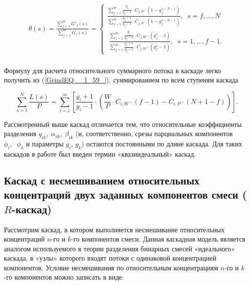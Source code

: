 \begin{equation} \label{GrindEQ__1_61_} 
  \begin{array}{l} {\theta (s)=\frac{\sum _{j=1}^{m}G'_{j} (s) }{\sum _{j=1}^{m}G_{j} (s) } =\left\{\begin{array}{l} {\frac{\sum _{j=1}^{m}\frac{g_{j} }{g_{j} -1} \cdot C_{j,P} \cdot \left(1-g_{j}^{s-N-1} \right) }{\sum _{j=1}^{m}\frac{g_{j} +1}{g_{j} -1} \cdot C_{j,P} \cdot \left(1-g_{j}^{s-N-1} \right)} ,\; \; s=f,...,N} \\ {\; \frac{\sum _{j=1}^{m}\frac{g_{j} }{g_{j} -1} \cdot C_{j,W} \cdot \left(g_{j}^{s} -1\right) }{\sum _{j=1}^{m}\frac{g_{j} +1}{g_{j} -1} \cdot C_{j,W} \cdot \left(g_{j}^{s} -1\right)} ,\; \; s=1,...,f-1.} \end{array}\right. } \\ {\; } \end{array} 
\end{equation}

Формулу для расчета относительного суммарного потока в каскаде легко получить из (\ref{GrindEQ__1_59_}), суммированием по всем ступеням каскада

\begin{equation} \label{GrindEQ__1_62_} 
  \sum _{s=1}^{N}\frac{L(s)}{P} =\sum _{i=1}^{m}\left [\frac{g_{i} +1}{g_{i} -1} \cdot \left(\frac{W}{P} \cdot C_{i,W} \cdot (f-1)-C_{i,P} \cdot \left(N+1-f\right)\right)\right ]   .   
\end{equation} 
  
Рассмотренный выше каскад отличается тем, что относительные коэффициенты разделения $q_{ik} ,\; \alpha _{ik} ,\; \beta _{ik} $ (и, соответственно, срезы парциальных компонентов $\phi _{i} ,\; \; \phi _{k} $ и параметры $g_{i} $, $g_{k} $) остаются постоянными по длине каскада. Для таких каскадов в работе \cite{sazykinKvaziidealnyeKaskadyDlya2000} был введен термин «квазиидеальный» каскад.

\subsection{Каскад с несмешиванием относительных концентраций двух заданных компонентов смеси ($R$-каскад)}\label{R_cas}

Рассмотрим каскад, в котором выполняется несмешивание относительных концентраций $n$-го и $k$-го компонентов смеси. Данная каскадная модель является аналогом используемого в теории разделения бинарных смесей «идеального» каскада, в «узлы» которого входят потоки с одинаковой концентрацией компонентов. Условие несмешивания по относительным концентрациям $n$-го и $k$-го компонентов можно записать в виде:

